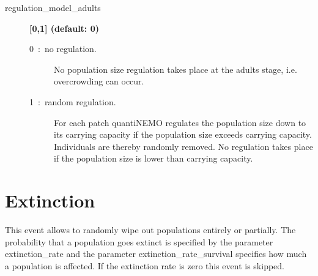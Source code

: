 \documentclass[letterpaper,12pt,oneside]{book}
\begin{document}
\begin{description}
\item[regulation\_model\_adults] \textbf{[0,1] (default: 0)}
\begin{description}
\item[0~:~no regulation.] No population size regulation takes place at the adults stage, i.e. overcrowding can occur.
\item[1~:~random regulation.] For each patch quantiNEMO regulates the population size down to its carrying capacity if the population size exceeds carrying capacity. Individuals are thereby randomly removed. No regulation takes place if the population size is lower than carrying capacity.
\end{description}
\end{description}

\section{Extinction}\label{8extinction}
This event allows to randomly wipe out populations entirely or partially. The probability that a population goes extinct is specified by the parameter \textsf{extinction\_rate} and the parameter \textsf{extinction\_rate\_survival} specifies how much a population is affected. If the extinction rate is zero this event is skipped.
\end{document}
